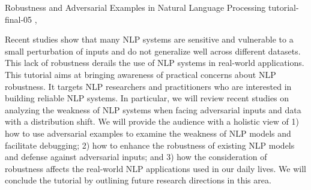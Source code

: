 \begin{tutorial}
  {Robustness and Adversarial Examples in Natural Language Processing}
  {tutorial-final-05}
  {\daydateyear, \tutorialmorningtime}
  {\TutLocA}

Recent studies show that many NLP systems are sensitive and vulnerable to a small perturbation of inputs and do not generalize well across different datasets. This lack of robustness derails the use of NLP systems in real-world applications. This tutorial aims at bringing awareness of practical concerns about NLP robustness. It targets NLP researchers and practitioners who are interested in building reliable NLP systems. In particular, we will review recent studies on analyzing the weakness of NLP systems when facing adversarial inputs and data with a distribution shift. We will provide the audience with a holistic view of 1) how to use adversarial examples to examine the weakness of NLP models and facilitate debugging; 2) how to enhance the robustness of existing NLP models and defense against adversarial inputs; and 3) how the consideration of robustness affects the real-world NLP applications used in our daily lives. We will conclude the tutorial by outlining future research directions in this area.

\end{tutorial}
